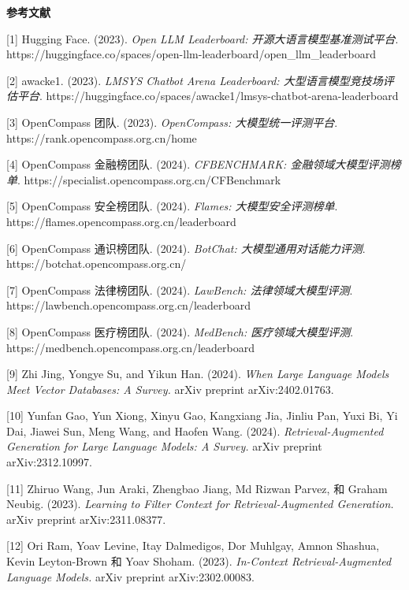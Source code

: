 \documentclass[
]{article}
\begin{document}
\textbf{参考文献}

{[}1{]} Hugging Face. (2023). \emph{Open LLM Leaderboard:
开源大语言模型基准测试平台}.
https://huggingface.co/spaces/open-llm-leaderboard/open\_llm\_leaderboard

{[}2{]} awacke1. (2023). \emph{LMSYS Chatbot Arena Leaderboard:
大型语言模型竞技场评估平台}.
https://huggingface.co/spaces/awacke1/lmsys-chatbot-arena-leaderboard

{[}3{]} OpenCompass 团队. (2023). \emph{OpenCompass:
大模型统一评测平台}. https://rank.opencompass.org.cn/home

{[}4{]} OpenCompass 金融榜团队. (2024). \emph{CFBENCHMARK:
金融领域大模型评测榜单}.
https://specialist.opencompass.org.cn/CFBenchmark

{[}5{]} OpenCompass 安全榜团队. (2024). \emph{Flames:
大模型安全评测榜单}. https://flames.opencompass.org.cn/leaderboard

{[}6{]} OpenCompass 通识榜团队. (2024). \emph{BotChat:
大模型通用对话能力评测}. https://botchat.opencompass.org.cn/

{[}7{]} OpenCompass 法律榜团队. (2024). \emph{LawBench:
法律领域大模型评测}. https://lawbench.opencompass.org.cn/leaderboard

{[}8{]} OpenCompass 医疗榜团队. (2024). \emph{MedBench:
医疗领域大模型评测}. https://medbench.opencompass.org.cn/leaderboard

{[}9{]} Zhi Jing, Yongye Su, and Yikun Han. (2024). \emph{When Large
Language Models Meet Vector Databases: A Survey.} arXiv preprint
arXiv:2402.01763.

{[}10{]} Yunfan Gao, Yun Xiong, Xinyu Gao, Kangxiang Jia, Jinliu Pan,
Yuxi Bi, Yi Dai, Jiawei Sun, Meng Wang, and Haofen Wang. (2024).
\emph{Retrieval-Augmented Generation for Large Language Models: A
Survey.} arXiv preprint arXiv:2312.10997.

{[}11{]} Zhiruo Wang, Jun Araki, Zhengbao Jiang, Md Rizwan Parvez, 和
Graham Neubig. (2023). \emph{Learning to Filter Context for
Retrieval-Augmented Generation.} arXiv preprint arXiv:2311.08377.

{[}12{]} Ori Ram, Yoav Levine, Itay Dalmedigos, Dor Muhlgay, Amnon
Shashua, Kevin Leyton-Brown 和 Yoav Shoham. (2023). \emph{In-Context
Retrieval-Augmented Language Models.} arXiv preprint arXiv:2302.00083.
\end{document}
